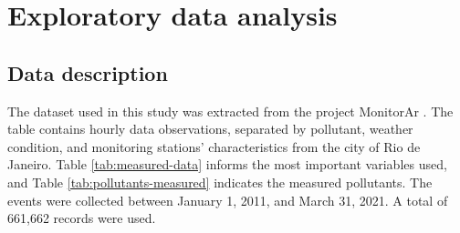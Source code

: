 \section{Exploratory data analysis}

\subsection{Data description}

The dataset used in this study was extracted from the project MonitorAr
\cite{dataset-rio-ar-quality}. The table contains hourly data observations, separated by
pollutant, weather condition, and monitoring stations' characteristics from
the city of Rio de Janeiro. Table
\ref{tab:measured-data} informs the most important variables used, and Table
\ref{tab:pollutants-measured} indicates the measured pollutants. The events were collected between January 1,
2011,
and March 31, 2021. A total of 661,662 records were used. 

